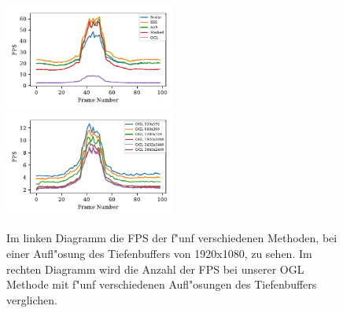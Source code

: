 \documentclass[journal]{vgtc}
\begin{document}
\begin{figure}
	\begin{minipage}{\textwidth}
		\includegraphics[width=0.5\textwidth]{images/Evaluation_1_Results_FPS.pdf}
		\includegraphics[width=0.5\textwidth]{images/Evaluation_4_Results_FPS.pdf}
	\end{minipage}
	\begin{minipage}{\textwidth}
		\centering
	\end{minipage}
	\caption{Im linken Diagramm die FPS der f"unf verschiedenen Methoden, bei einer Aufl"osung des Tiefenbuffers von 1920x1080, zu sehen.
		Im rechten Diagramm wird die Anzahl der FPS bei unserer OGL Methode mit f"unf verschiedenen Aufl"osungen des Tiefenbuffers verglichen.}
	\label{fig:resolution_fps}
\end{figure}
\end{document}
